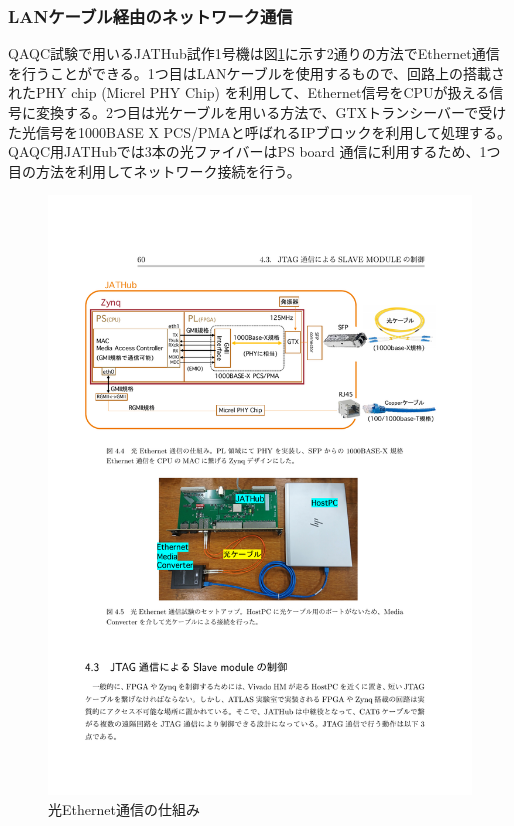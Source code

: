 \subsubsection{LANケーブル経由のネットワーク通信}
\label{subsubsec_network}
\baselineskip
QAQC試験で用いるJATHub試作1号機は図\ref{JATHub_ether}に示す2通りの方法でEthernet通信を行うことができる。1つ目はLANケーブルを使用するもので、回路上の搭載されたPHY chip (Micrel PHY Chip) を利用して、Ethernet信号をCPUが扱える信号に変換する。2つ目は光ケーブルを用いる方法で、GTXトランシーバーで受けた光信号を1000BASE X PCS/PMAと呼ばれるIPブロックを利用して処理する。QAQC用JATHubでは3本の光ファイバーはPS board 通信に利用するため、1つ目の方法を利用してネットワーク接続を行う。

\begin{figure} 
\centering
\includegraphics[width=16cm]{fig/QAQC/JATHub_ether.pdf}
\caption[光Ethernet通信の仕組み]{光Ethernet通信の仕組み\cite{mt_atanaka}}
\label{JATHub_ether}
\end{figure}


